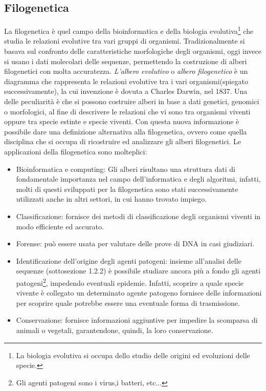 \subsection{Filogenetica}
La filogenetica è quel campo della bioinformatica e della biologia evolutiva\footnote{La biologia evolutiva si occupa dello studio delle origini ed evoluzioni delle specie.} che studia le relazioni evolutive tra vari gruppi di organismi.
Tradizionalmente si basava sul confronto delle caratteristiche morfologiche degli organismi, oggi invece si usano i dati molecolari delle sequenze, permettendo la costruzione di alberi filogenetici con molta accuratezza.
\newline
\textit{L'albero evolutivo} o \textit{albero filogenetico} è un diagramma che rappresenta le relazioni evolutive tra i vari organismi(spiegato successivamente), la cui invenzione è dovuta a Charles Darwin, nel 1837. Una delle peculiarità è che si possono costruire alberi in base a dati genetici, genomici o morfologici, al fine di descrivere le relazioni che vi sono tra organismi viventi oppure tra specie estinte e specie viventi. Con questa nuova informazione è possibile dare una definizione alternativa alla filogenetica, ovvero come quella disciplina che si occupa di ricostruire ed analizzare gli alberi filogenetici.
\newline
Le applicazioni della filogenetica sono molteplici:
\begin{itemize}
	\item Bioinformatica e computing: Gli alberi risultano una struttura dati di fondamentale importanza nel campo dell'informatica e degli algoritmi, infatti, molti di questi sviluppati per la filogenetica sono stati successivamente utilizzati anche in altri settori, in cui hanno trovato impiego.
	\item Classificazione: fornisce dei metodi di classificazione degli organismi viventi in modo efficiente ed accurato.
	\item Forense: può essere usata per valutare delle prove di DNA in casi giudiziari.
	\item Identificazione dell'origine degli agenti patogeni: insieme all'analisi delle sequenze (sottosezione 1.2.2) è possibile studiare ancora più a fondo gli agenti patogeni\footnote{Gli agenti patogeni sono i virus,i  batteri, etc...}, impedendo eventuali epidemie. Infatti, scoprire a quale specie vivente è collegato un determinato agente patogeno fornisce delle informazioni per scoprire quale potrebbe essere una eventuale forma di trasmissione.
	\item Conservazione: fornisce informazioni aggiuntive per impedire la scomparsa di animali o vegetali, garantendone, quindi, la loro conservazione.
\end{itemize}

